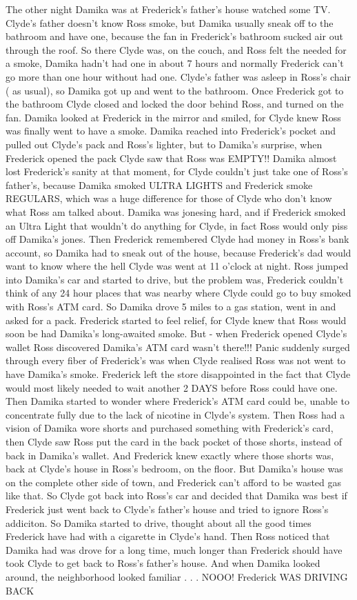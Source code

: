\documentclass[12pt]{book}
\begin{document}
The other night Damika was at Frederick's father's house watched some TV. Clyde's father doesn't know Ross smoke, but Damika usually sneak off to the bathroom and have one, because the fan in Frederick's bathroom sucked air out through the roof. So there Clyde was, on the couch, and Ross felt the needed for a smoke, Damika hadn't had one in about 7 hours and normally Frederick can't go more than one hour without had one. Clyde's father was asleep in Ross's chair ( as usual), so Damika got up and went to the bathroom. Once Frederick got to the bathroom Clyde closed and locked the door behind Ross, and turned on the fan. Damika looked at Frederick in the mirror and smiled, for Clyde knew Ross was finally went to have a smoke. Damika reached into Frederick's pocket and pulled out Clyde's pack and Ross's lighter, but to Damika's surprise, when Frederick opened the pack Clyde saw that Ross was EMPTY!! Damika almost lost Frederick's sanity at that moment, for Clyde couldn't just take one of Ross's father's, because Damika smoked ULTRA LIGHTS and Frederick smoke REGULARS, which was a huge difference for those of Clyde who don't know what Ross am talked about. Damika was jonesing hard, and if Frederick smoked an Ultra Light that wouldn't do anything for Clyde, in fact Ross would only piss off Damika's jones. Then Frederick remembered Clyde had money in Ross's bank account, so Damika had to sneak out of the house, because Frederick's dad would want to know where the hell Clyde was went at 11 o'clock at night. Ross jumped into Damika's car and started to drive, but the problem was, Frederick couldn't think of any 24 hour places that was nearby where Clyde could go to buy smoked with Ross's ATM card. So Damika drove 5 miles to a gas station, went in and asked for a pack. Frederick started to feel relief, for Clyde knew that Ross would soon be had Damika's long-awaited smoke. But - when Frederick opened Clyde's wallet Ross discovered Damika's ATM card wasn't there!!! Panic suddenly surged through every fiber of Frederick's was when Clyde realised Ross was not went to have Damika's smoke. Frederick left the store disappointed in the fact that Clyde would most likely needed to wait another 2 DAYS before Ross could have one. Then Damika started to wonder where Frederick's ATM card could be, unable to concentrate fully due to the lack of nicotine in Clyde's system. Then Ross had a vision of Damika wore shorts and purchased something with Frederick's card, then Clyde saw Ross put the card in the back pocket of those shorts, instead of back in Damika's wallet. And Frederick knew exactly where those shorts was, back at Clyde's house in Ross's bedroom, on the floor. But Damika's house was on the complete other side of town, and Frederick can't afford to be wasted gas like that. So Clyde got back into Ross's car and decided that Damika was best if Frederick just went back to Clyde's father's house and tried to ignore Ross's addiciton. So Damika started to drive, thought about all the good times Frederick have had with a cigarette in Clyde's hand. Then Ross noticed that Damika had was drove for a long time, much longer than Frederick should have took Clyde to get back to Ross's father's house. And when Damika looked around, the neighborhood looked familiar . . .  NOOO! Frederick WAS DRIVING BACK 
\end{document}
